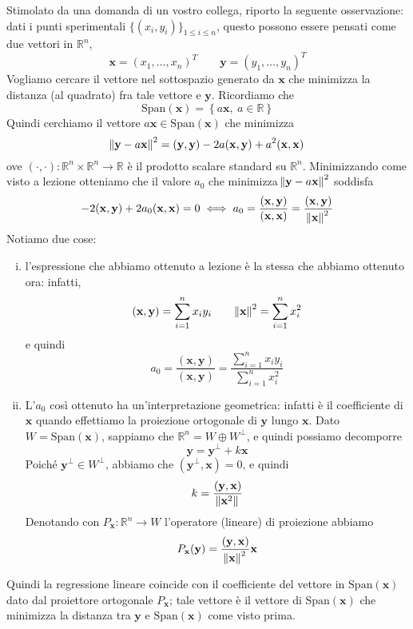 \begin{remark}
    Stimolato da una domanda di un vostro collega, riporto la seguente osservazione: dati i punti sperimentali $\{(x_i, y_i)\}_{1\le i \le n}$, questo possono essere pensati come due vettori in $\mathbb{R}^n$, 
\[
 \mathbf{x}=(x_1, \dots, x_n)^T \qquad \mathbf{y} = (y_1, \dots, y_n)^T
\]
Vogliamo cercare il vettore nel sottospazio generato da $\mathbf{x}$ che minimizza la distanza (al quadrato) fra tale vettore e $\mathbf{y}$. Ricordiamo che 
\[
\mathrm{Span}(\mathbf{x}) = \left\{a\mathbf{x}, \ a\in\mathbb{R}\right\}
\]
Quindi cerchiamo il vettore $a\mathbf{x}\in\mathrm{Span}(\mathbf{x})$ che minimizza
\[
\norm{\mathbf{y}-a\mathbf{x}}^2 = (\mathbf{y}, \mathbf{y})-2a(\mathbf{x}, \mathbf{y}) + a^2(\mathbf{x}, \mathbf{x})
\]
ove $( \cdot, \cdot)\colon \mathbb{R}^n \times \mathbb{R}^n \to \mathbb{R}$ è il prodotto scalare standard su $\mathbb{R}^n$. Minimizzando come visto a lezione otteniamo che il valore $a_0$ che minimizza $\norm{\mathbf{y}-a\mathbf{x}}^2$ soddisfa
\[
-2(\mathbf{x}, \mathbf{y}) + 2a_0(\mathbf{x}, \mathbf{x}) = 0 \iff a_0 = \frac{(\mathbf{x}, \mathbf{y})}{(\mathbf{x}, \mathbf{x})} = \frac{(\mathbf{x}, \mathbf{y})}{\norm{\mathbf{x}}^2}
\]
Notiamo due cose:
\begin{enumerate}[(i)]
    \item l'espressione che abbiamo ottenuto a lezione è la stessa che abbiamo ottenuto ora: infatti,
    \[
    (\mathbf{x}, \mathbf{y}) = \sum_{i=1}^n x_i y_i \qquad \norm{\mathbf{x}}^2 = \sum_{i=1}^n x_i^2
    \]
    e quindi
    \[
    a_0 = \frac{(\mathbf{x}, \mathbf{y})}{(\mathbf{x}, \mathbf{y})} = \frac{\sum_{i=1}^n x_iy_i}{\sum_{i=1}^n x_i^2}
    \]
    \item L'$a_0$ così ottenuto ha un'interpretazione geometrica: infatti è il coefficiente di $\mathbf{x}$ quando effettiamo la proiezione ortogonale di $\mathbf{y}$ lungo $\mathbf{x}$. Dato $W = \mathrm{Span}(\mathbf{x})$, sappiamo che $\mathbb{R}^n = W \oplus W^\perp$, e quindi possiamo decomporre
    \[
    \mathbf{y} = \mathbf{y}^\perp + k\mathbf{x}
    \]
    Poiché $\mathbf{y}^\perp\in W^\perp$, abbiamo che $(\mathbf{y}^\perp, \mathbf{x})=0$, e quindi
    \[
    k= \frac{(\mathbf{y}, \mathbf{x})}{\norm{\mathbf{x}^2}}
    \]
    Denotando con $P_{\mathbf{x}}\colon \mathbb{R}^n\to W$ l'operatore (lineare) di proiezione abbiamo
    \[
    P_{\mathbf{x}}(\mathbf{y}) = \frac{(\mathbf{y}, \mathbf{x})}{\norm{\mathbf{x}}^2}\mathbf{x}
    \]
\end{enumerate}
Quindi la regressione lineare coincide con il coefficiente del vettore in $\mathrm{Span}(\mathbf{x})$ dato dal proiettore ortogonale $P_{\mathbf{x}}$; tale vettore è il vettore di $\mathrm{Span}(\mathbf{x})$ che minimizza la distanza tra $\mathbf{y}$ e $\mathrm{Span}(\mathbf{x})$ come visto prima.\\

\end{remark}
